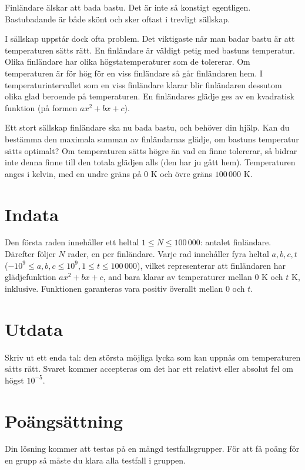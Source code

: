 Finländare älskar att bada bastu. Det är inte så konstigt egentligen.
Bastubadande är både skönt och sker oftast i trevligt sällskap.

I sällskap uppstår dock ofta problem. Det viktigaste när man badar bastu är att temperaturen sätts rätt.
En finländare är väldigt petig med bastuns temperatur.
Olika finländare har olika högstatemperaturer som de tolererar.
Om temperaturen är för hög för en viss finländare så går finländaren hem.
I temperaturintervallet som en viss finländare klarar blir finländaren dessutom olika glad beroende på temperaturen.
En finländares glädje ges av en kvadratisk funktion (på formen $ax^2 + bx + c$).

Ett stort sällskap finländare ska nu bada bastu, och behöver din hjälp.
Kan du bestämma den maximala summan av finländarnas glädje, om bastuns temperatur sätts optimalt?
Om temperaturen sätts högre än vad en finne tolererar, så bidrar inte denna finne till den totala glädjen alls (den har ju gått hem).
Temperaturen anges i kelvin, med en undre gräns på $0 \textrm{ K}$ och övre gräns $100\,000 \textrm{ K}$.

\section*{Indata}
Den första raden innehåller ett heltal $1 \le N \le 100\,000$: antalet finländare.
Därefter följer $N$ rader, en per finländare.
Varje rad innehåller fyra heltal $a, b, c, t$ ($-10^9 \le a,b,c \le 10^9, 1 \le t \le 100\,000$), vilket representerar att finländaren har glädjefunktion $ax^2 + bx + c$, and bara klarar av temperaturer mellan $0\textrm{ K}$ och $t\textrm{ K}$, inklusive.
Funktionen garanteras vara positiv överallt mellan $0$ och $t$.

\section*{Utdata}
Skriv ut ett enda tal: den största möjliga lycka som kan uppnås om temperaturen sätts rätt.
Svaret kommer accepteras om det har ett relativt eller absolut fel om högst $10^{-5}$.


\section*{Poängsättning}
Din lösning kommer att testas på en mängd testfallsgrupper. För att få poäng för en grupp
så måste du klara alla testfall i gruppen.

